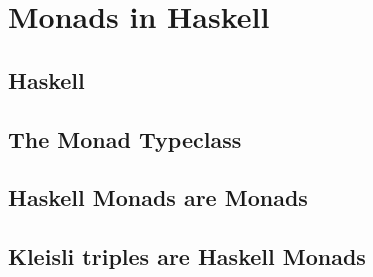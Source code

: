 \documentclass[a4paper]{article}
\theoremstyle{plain}
\theoremstyle{definition}
\begin{document}
\section{Monads in Haskell}
\subsection{Haskell}
\subsection{The Monad Typeclass}
\subsection{Haskell Monads are Monads}
\subsection{Kleisli triples are Haskell Monads}
\end{document}
